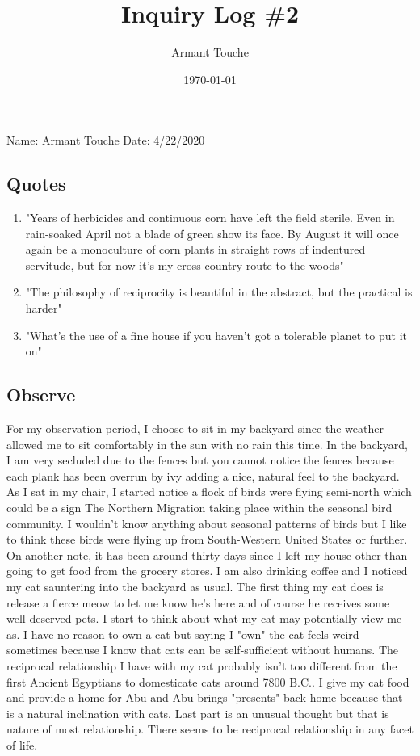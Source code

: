 \documentclass[a4paper,man,biblatex]{apa6}
\title{Inquiry Log \#2}
\author{Armant Touche}
\affiliation{Portland State University}
\date{\today}
\begin{document}
\thispagestyle{otherpage}
\setcounter{biburllcpenalty}{7000}
\setcounter{biburlucpenalty}{8000}


\noindent Name: Armant Touche\newline
\noindent Date: 4/22/2020

\subsection{Quotes}
\begin{enumerate}
    \item "Years of herbicides and continuous corn have left the field sterile. Even in rain-soaked April not a blade of green show its face. By August it will once again be a monoculture of corn plants in straight rows of indentured servitude, but for now it's my cross-country route to the woods"\autocite[175]{braiding}
    \item "The philosophy of reciprocity is beautiful in the abstract, but the practical is harder" \autocite[238]{braiding}
    \item "What's the use of a fine house if you haven't got a tolerable planet to put it on" \autocite{capecod}
\end{enumerate}

\subsection{Observe} For my observation period, I choose to sit in my backyard since the weather allowed me to sit comfortably in the sun with no rain this time. In the backyard, I am very secluded due to the fences but you cannot notice the fences because each plank has been overrun by ivy adding a nice, natural feel to the backyard. As I sat in my chair, I started notice a flock of birds were flying semi-north which could be a sign The Northern Migration taking place within the seasonal bird community. I wouldn't know anything about seasonal patterns of birds but I like to think these birds were flying up from South-Western United States or further. On another note, it has been around thirty days since I left my house other than going to get food from the grocery stores. I am also drinking coffee and I noticed my cat sauntering into the backyard as usual. The first thing my cat does is release a fierce meow to let me know he's here and of course he receives some well-deserved pets. I start to think about what my cat may potentially view me as. I have no reason to own a cat but saying I "own" the cat feels weird sometimes because I know that cats can be self-sufficient without humans. The reciprocal relationship I have with my cat probably isn't too different from the first Ancient Egyptians to domesticate cats around 7800 B.C.. I give my cat food and provide a home for Abu and Abu brings "presents" back home because that is a natural inclination with cats. Last part is an unusual thought but that is nature of most relationship. There seems to be reciprocal relationship in any facet of life.
\end{document}
